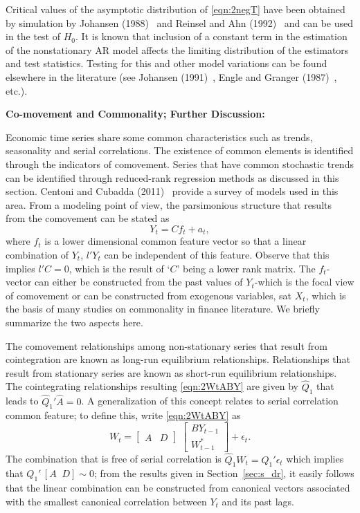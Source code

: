 Critical values of the asymptotic distribution of \eqref{eqn:2negT} have been obtained by simulation by Johansen (1988)~\cite{johansen1988statistical} and Reinsel and Ahn (1992)~\cite{reinsel1992vector} and can be used in the test of $H_0$. It is known that inclusion of a constant term in the estimation of the nonstationary AR model affects the limiting distribution of the estimators and test statistics. Testing for this and other model variations can be found elsewhere in the literature (see Johansen (1991)~\cite{johansen1991estimation}, Engle and Granger (1987)~\cite{engle1987co}, etc.). \twomedskip


\noindent \textbf{Co-movement and Commonality; Further Discussion:} \twomedskip


Economic time series share some common characteristics such as trends, seasonality and serial correlations. The existence of common elements is identified through the indicators of comovement. Series that have common stochastic trends can be identified through reduced-rank regression methods as discussed in this section. Centoni and Cubadda (2011)~\cite{centoni} provide a survey of models used in this area. From a modeling point of view, the parsimonious structure that results from the comovement can be stated as
	\begin{equation} \label{eqn:discyt}
	Y_t= Cf_t + a_t,
	\end{equation}  
where $f_t$ is a lower dimensional common feature vector so that a linear combination of $Y_t$, $l' Y_t$ can be independent of this feature. Observe that this implies $l'C=0$, which is the result of `$C$' being a lower rank matrix. The $f_t$-vector can either be constructed from the past values of $Y_t$-which is the focal view of comovement or can be constructed from exogenous variables, sat $X_t$, which is the basis of many studies on commonality in finance literature. We briefly summarize the two aspects here. 


The comovement relationships among non-stationary series that result from cointegration are known as long-run equilibrium relationships. Relationships that result from stationary series are known as short-run equilibrium relationships. The cointegrating relationships resulting  \eqref{eqn:2WtABY} are given by $\hat{Q}_1$ that leads to $\hat{Q}_1' \hat{A}=0$. A generalization of this concept relates to serial correlation common feature; to define this, write \eqref{eqn:2WtABY} as
	\begin{equation} \label{eqn:wtrewrite}
	W_t=  \begin{bmatrix} A & D \end{bmatrix} \; \begin{bmatrix} BY_{t-1} \\ W_{t-1}^* \end{bmatrix} + \epsilon_t.
	\end{equation}
The combination that is free of serial correlation is $\hat{Q}_1W_t= Q_1' \epsilon_t$ which implies that $Q_1' \,[A \;\; D] \sim 0$; from the results given in Section~\ref{sec:s_dr}, it easily follows that the linear combination can be constructed from canonical vectors associated with the smallest canonical correlation between $Y_t$ and its past lags.


